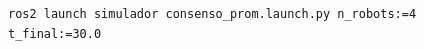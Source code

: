 {\renewcommand{\lstlistingname}{Terminal}
\begin{figure}[t]
\centering
\begin{lstlisting}[style=bash,
    caption={Lanzamiento del experimento con argumentos personalizados.},
    label={lst:consenso_launch_cmd}]
ros2 launch simulador consenso_prom.launch.py n_robots:=4 t_final:=30.0
\end{lstlisting}
\end{figure}
}
